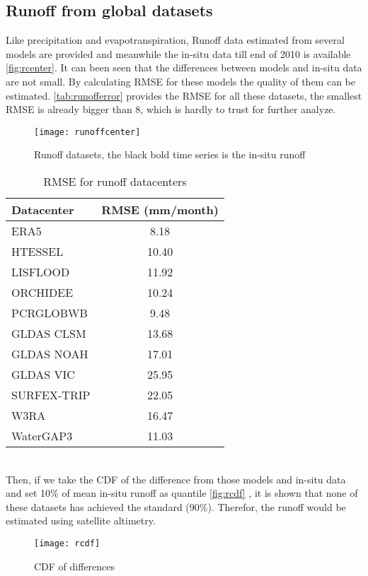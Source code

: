 \subsection{Runoff from global datasets}
Like precipitation and evapotranspiration, Runoff data estimated from several models are provided and meanwhile the in-situ data till end of 2010 is available \autoref{fig:rcenter}. It can been seen that the differences between models and in-situ data are not small.  By calculating RMSE for these models the quality of them can be estimated. \autoref{tab:runofferror} provides the RMSE for all these datasets, the smallest RMSE is already bigger than 8, which is hardly to trust for further analyze. 
\begin{figure}[htbp]\centering
	\centering
	\texttt{[image: runoffcenter]} %
	\caption{Runoff datasets, the black bold time series is the in-situ runoff} 
	\label{fig:rcenter}
\end{figure}
\begin{table}[htbp]\label{tab:rmse} \centering
	\begin{tabular}{|l|c|}
		\hline
		Datacenter  & RMSE (mm/month) \\ \hline
		ERA5        & 8.18  \\ \hline
		HTESSEL     & 10.40 \\ \hline
		LISFLOOD    & 11.92 \\ \hline
		ORCHIDEE    & 10.24 \\ \hline
		PCRGLOBWB   & 9.48  \\ \hline
		GLDAS CLSM  & 13.68 \\ \hline
		GLDAS NOAH  & 17.01 \\ \hline
		GLDAS VIC   & 25.95 \\ \hline
		SURFEX-TRIP & 22.05 \\ \hline
		W3RA        & 16.47 \\ \hline
		WaterGAP3   & 11.03 \\ \hline
	\end{tabular}
	\caption{RMSE for runoff datacenters}
	\label{tab:runofferror}
\end{table}\\
Then, if we take the CDF of the difference from those models and in-situ data and set 10\% of mean in-situ runoff as quantile \autoref{fig:rcdf} , it is shown that none of these datasets has achieved the standard (90\%). Therefor, the runoff would be estimated using satellite altimetry. 
\begin{figure}[htbp]
	\centering
	\texttt{[image: rcdf]} %
	\caption{CDF of differences} 
	\label{fig:rcdf}
\end{figure}\\

